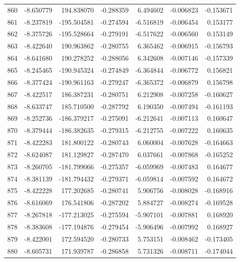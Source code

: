 \begin{tabular}{rrrrrrr}
 860 &  -8.650779 &  194.838070 & -0.288359 &    6.494602 &   -0.006823 & -0.153671 \\
 861 &  -8.237819 & -195.504581 & -0.274594 &   -6.516819 &   -0.006454 &  0.153177 \\
 862 &  -8.375726 & -195.528664 & -0.279191 &   -6.517622 &   -0.006560 &  0.153149 \\
 863 &  -8.422640 &  190.963862 & -0.280755 &    6.365462 &   -0.006915 & -0.156793 \\
 864 &  -8.641680 &  190.278252 & -0.288056 &    6.342608 &   -0.007146 & -0.157339 \\
 865 &  -8.245465 & -190.945324 & -0.274849 &   -6.364844 &   -0.006772 &  0.156821 \\
 866 &  -8.377424 & -190.961163 & -0.279247 &   -6.365372 &   -0.006879 &  0.156798 \\
 867 &  -8.422517 &  186.387231 & -0.280751 &    6.212908 &   -0.007258 & -0.160627 \\
 868 &  -8.633747 &  185.710500 & -0.287792 &    6.190350 &   -0.007494 & -0.161193 \\
 869 &  -8.252736 & -186.379217 & -0.275091 &   -6.212641 &   -0.007113 &  0.160647 \\
 870 &  -8.379444 & -186.382635 & -0.279315 &   -6.212755 &   -0.007222 &  0.160635 \\
 871 &  -8.422283 &  181.800122 & -0.280743 &    6.060004 &   -0.007628 & -0.164663 \\
 872 &  -8.624087 &  181.129827 & -0.287470 &    6.037661 &   -0.007868 & -0.165252 \\
 873 &  -8.260705 & -181.799066 & -0.275357 &   -6.059969 &   -0.007483 &  0.164677 \\
 874 &  -8.381139 & -181.794432 & -0.279371 &   -6.059814 &   -0.007592 &  0.164672 \\
 875 &  -8.422228 &  177.202685 & -0.280741 &    5.906756 &   -0.008028 & -0.168916 \\
 876 &  -8.616069 &  176.541806 & -0.287202 &    5.884727 &   -0.008274 & -0.169528 \\
 877 &  -8.267818 & -177.213025 & -0.275594 &   -5.907101 &   -0.007881 &  0.168920 \\
 878 &  -8.383608 & -177.194876 & -0.279454 &   -5.906496 &   -0.007992 &  0.168927 \\
 879 &  -8.422001 &  172.594520 & -0.280733 &    5.753151 &   -0.008462 & -0.173405 \\
 880 &  -8.605731 &  171.939787 & -0.286858 &    5.731326 &   -0.008711 & -0.174044 \\

\end{tabular}
